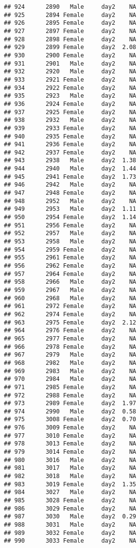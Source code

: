 \documentclass[
]{article}
\begin{document}
\begin{verbatim}
## 924      2890   Male     day2    NA
## 925      2894 Female     day2    NA
## 926      2895 Female     day2    NA
## 927      2897 Female     day2    NA
## 928      2898 Female     day2    NA
## 929      2899 Female     day2  2.08
## 930      2900 Female     day2    NA
## 931      2901   Male     day2    NA
## 932      2920   Male     day2    NA
## 933      2921 Female     day2    NA
## 934      2922 Female     day2    NA
## 935      2923   Male     day2    NA
## 936      2924 Female     day2    NA
## 937      2925 Female     day2    NA
## 938      2932   Male     day2    NA
## 939      2933 Female     day2    NA
## 940      2935 Female     day2    NA
## 941      2936 Female     day2    NA
## 942      2937 Female     day2    NA
## 943      2938   Male     day2  1.38
## 944      2940   Male     day2  1.44
## 945      2941 Female     day2  1.73
## 946      2942   Male     day2    NA
## 947      2948 Female     day2    NA
## 948      2952   Male     day2    NA
## 949      2953   Male     day2  1.11
## 950      2954 Female     day2  1.14
## 951      2956 Female     day2    NA
## 952      2957   Male     day2    NA
## 953      2958   Male     day2    NA
## 954      2959 Female     day2    NA
## 955      2961 Female     day2    NA
## 956      2962 Female     day2    NA
## 957      2964 Female     day2    NA
## 958      2966   Male     day2    NA
## 959      2967   Male     day2    NA
## 960      2968   Male     day2    NA
## 961      2972 Female     day2    NA
## 962      2974 Female     day2    NA
## 963      2975 Female     day2  2.12
## 964      2976 Female     day2    NA
## 965      2977 Female     day2    NA
## 966      2978 Female     day2    NA
## 967      2979   Male     day2    NA
## 968      2982   Male     day2    NA
## 969      2983   Male     day2    NA
## 970      2984   Male     day2    NA
## 971      2985 Female     day2    NA
## 972      2988 Female     day2    NA
## 973      2989 Female     day2  1.97
## 974      2990   Male     day2  0.58
## 975      3008 Female     day2  0.70
## 976      3009 Female     day2    NA
## 977      3010 Female     day2    NA
## 978      3013 Female     day2    NA
## 979      3014 Female     day2    NA
## 980      3016   Male     day2    NA
## 981      3017   Male     day2    NA
## 982      3018   Male     day2    NA
## 983      3019 Female     day2  1.35
## 984      3027   Male     day2    NA
## 985      3028 Female     day2    NA
## 986      3029 Female     day2    NA
## 987      3030   Male     day2  0.29
## 988      3031   Male     day2    NA
## 989      3032 Female     day2    NA
## 990      3033 Female     day2    NA

\end{verbatim}
\end{document}
